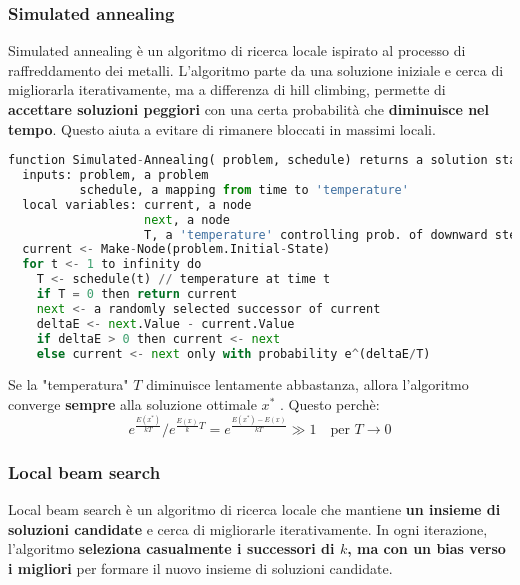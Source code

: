 \documentclass[a4paper]{article}
\begin{document}
\subsubsection{Simulated annealing}
Simulated annealing è un algoritmo di ricerca locale ispirato al processo di
raffreddamento dei metalli. L'algoritmo parte da una soluzione iniziale e
cerca di migliorarla iterativamente, ma a differenza di hill climbing, permette
di \textbf{accettare soluzioni peggiori} con una certa probabilità che
\textbf{diminuisce nel tempo}. Questo aiuta a evitare di rimanere bloccati in massimi
locali.
\begin{lstlisting}[language=Python]
function Simulated-Annealing( problem, schedule) returns a solution state
  inputs: problem, a problem
          schedule, a mapping from time to 'temperature'
  local variables: current, a node
                   next, a node
                   T, a 'temperature' controlling prob. of downward steps
  current <- Make-Node(problem.Initial-State)
  for t <- 1 to infinity do
    T <- schedule(t) // temperature at time t
    if T = 0 then return current
    next <- a randomly selected successor of current
    deltaE <- next.Value - current.Value
    if deltaE > 0 then current <- next
    else current <- next only with probability e^(deltaE/T)
\end{lstlisting}
\noindent
Se la "temperatura" \( T \) diminuisce lentamente abbastanza, allora l'algoritmo
converge \textbf{sempre} alla soluzione ottimale \( x^* \) . Questo perchè:
\[
  e^{\frac{E(x^*)}{kT}}/e^{\frac{E(x)}kT}
  =
  e^{\frac{E(x^*) - E(x)}{kT}} \gg 1 \quad \text{per } T \to 0
\] 

\subsubsection{Local beam search}
Local beam search è un algoritmo di ricerca locale che mantiene \textbf{un insieme di
soluzioni candidate} e cerca di migliorarle iterativamente.
In ogni iterazione, l'algoritmo 
\textbf{seleziona casualmente i successori di \( k \), ma con un bias verso i migliori}
per formare il nuovo insieme di soluzioni candidate.
\end{document}
